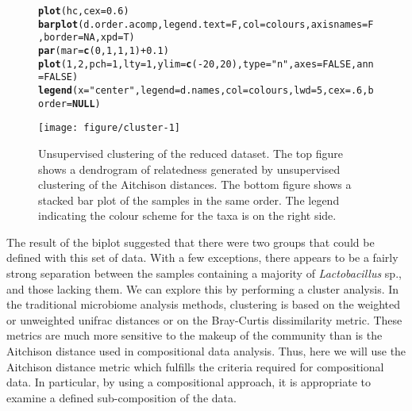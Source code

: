 \documentclass[11pt]{article}\usepackage[]{graphicx}\usepackage[]{color}
\makeatletter
\def\maxwidth{ %
  \ifdim\Gin@nat@width>\linewidth
    \linewidth
  \else
    \Gin@nat@width
  \fi
}
\newcommand{\hlnum}[1]{\textcolor[rgb]{0.686,0.059,0.569}{#1}}%
\newcommand{\hlstr}[1]{\textcolor[rgb]{0.192,0.494,0.8}{#1}}%
\newcommand{\hlopt}[1]{\textcolor[rgb]{0,0,0}{#1}}%
\newcommand{\hlstd}[1]{\textcolor[rgb]{0.345,0.345,0.345}{#1}}%
\newcommand{\hlkwa}[1]{\textcolor[rgb]{0.161,0.373,0.58}{\textbf{#1}}}%
\newcommand{\hlkwc}[1]{\textcolor[rgb]{0.333,0.667,0.333}{#1}}%
\newcommand{\hlkwd}[1]{\textcolor[rgb]{0.737,0.353,0.396}{\textbf{#1}}}%
\newenvironment{kframe}{%
 \def\at@end@of@kframe{}%
 \ifinner\ifhmode%
  \def\at@end@of@kframe{\end{minipage}}%
  \begin{minipage}{\columnwidth}%
 \fi\fi%
 \def\FrameCommand##1{\hskip\@totalleftmargin \hskip-\fboxsep
 \colorbox{shadecolor}{##1}\hskip-\fboxsep
     \hskip-\linewidth \hskip-\@totalleftmargin \hskip\columnwidth}%
 \MakeFramed {\advance\hsize-\width
   \@totalleftmargin\z@ \linewidth\hsize
   \@setminipage}}%
 {\par\unskip\endMakeFramed%
 \at@end@of@kframe}
\newenvironment{knitrout}{}{} %
\makeatother
\begin{document}
\begin{figure}
\begin{center}
\begin{knitrout}
\begin{kframe}
\begin{alltt}
\hlkwd{plot}\hlstd{(hc,} \hlkwc{cex}\hlstd{=}\hlnum{0.6}\hlstd{)}
\hlkwd{barplot}\hlstd{(d.order.acomp,} \hlkwc{legend.text}\hlstd{=F,} \hlkwc{col}\hlstd{=colours,} \hlkwc{axisnames}\hlstd{=F,} \hlkwc{border}\hlstd{=}\hlnum{NA}\hlstd{,} \hlkwc{xpd}\hlstd{=T)}
\hlkwd{par}\hlstd{(}\hlkwc{mar}\hlstd{=}\hlkwd{c}\hlstd{(}\hlnum{0}\hlstd{,}\hlnum{1}\hlstd{,}\hlnum{1}\hlstd{,}\hlnum{1}\hlstd{)}\hlopt{+}\hlnum{0.1}\hlstd{)}
\hlkwd{plot}\hlstd{(}\hlnum{1}\hlstd{,}\hlnum{2}\hlstd{,} \hlkwc{pch} \hlstd{=} \hlnum{1}\hlstd{,} \hlkwc{lty} \hlstd{=} \hlnum{1}\hlstd{,} \hlkwc{ylim}\hlstd{=}\hlkwd{c}\hlstd{(}\hlopt{-}\hlnum{20}\hlstd{,}\hlnum{20}\hlstd{),} \hlkwc{type} \hlstd{=} \hlstr{"n"}\hlstd{,} \hlkwc{axes} \hlstd{=} \hlnum{FALSE}\hlstd{,} \hlkwc{ann} \hlstd{=} \hlnum{FALSE}\hlstd{)}
\hlkwd{legend}\hlstd{(}\hlkwc{x}\hlstd{=}\hlstr{"center"}\hlstd{,} \hlkwc{legend}\hlstd{=d.names,} \hlkwc{col}\hlstd{=colours,} \hlkwc{lwd}\hlstd{=}\hlnum{5}\hlstd{,} \hlkwc{cex}\hlstd{=}\hlnum{.6}\hlstd{,} \hlkwc{border}\hlstd{=}\hlkwa{NULL}\hlstd{)}
\end{alltt}
\end{kframe}
\texttt{[image: figure/cluster-1]} 

\end{knitrout}
\caption{Unsupervised clustering of the reduced dataset. The top figure shows a dendrogram of relatedness generated by unsupervised clustering of the Aitchison distances. The bottom figure shows a stacked bar plot of the samples in the same order. The legend indicating the colour scheme for the taxa is on the right side. }
\label{cluster}
\end{center}
\end{figure}

The result of the biplot suggested that there were two groups that could be defined with this set of data. With a few exceptions, there appears to be a fairly strong separation between  the samples containing a majority of \emph{Lactobacillus} sp., and those lacking them. We can explore this by performing a cluster analysis. In the traditional microbiome analysis methods, clustering is based on the weighted or unweighted unifrac distances or on the Bray-Curtis dissimilarity metric. These metrics are much more sensitive to the makeup of the community than is the Aitchison distance used in compositional data analysis. Thus, here we will use the Aitchison distance metric which fulfills the criteria required for compositional data. In particular, by using a compositional approach, it is appropriate to examine a defined sub-composition of the data. 
\end{document}
